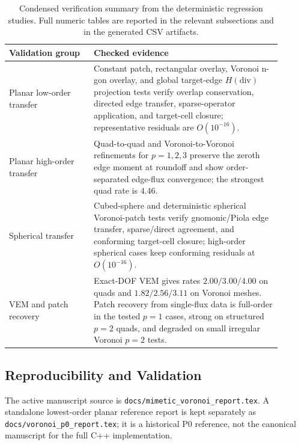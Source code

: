 \documentclass[11pt]{article}
\begin{document}
\begin{table}[t]
  \centering
  \small
  \begin{tabular}{@{}L{0.28\linewidth}L{0.62\linewidth}@{}}
  \toprule
  Validation group & Checked evidence \\
  \midrule
  Planar low-order transfer &
  Constant patch, rectangular overlay, Voronoi n-gon overlay, and global
  target-edge \(H(\mathrm{div})\) projection tests verify overlap conservation,
  directed edge transfer, sparse-operator application, and target-cell closure;
  representative residuals are \(O(10^{-16})\). \\
  Planar high-order transfer &
  Quad-to-quad and Voronoi-to-Voronoi refinements for \(p=1,2,3\) preserve the
  zeroth edge moment at roundoff and show order-separated edge-flux convergence;
  the strongest quad rate is \(4.46\). \\
  Spherical transfer &
  Cubed-sphere and deterministic spherical Voronoi-patch tests verify
  gnomonic/Piola edge transfer, sparse/direct agreement, and conforming
  target-cell closure; high-order spherical cases keep conforming residuals at
  \(O(10^{-16})\). \\
  VEM and patch recovery &
  Exact-DOF VEM gives rates \(2.00/3.00/4.00\) on quads and
  \(1.82/2.56/3.11\) on Voronoi meshes.  Patch recovery from single-flux data is
  full-order in the tested \(p=1\) cases, strong on structured \(p=2\) quads,
  and degraded on small irregular Voronoi \(p=2\) tests. \\
  \bottomrule
  \end{tabular}
  \caption{Condensed verification summary from the deterministic regression
  studies.  Full numeric tables are reported in the relevant subsections and in
  the generated CSV artifacts.}
  \label{tab:verification-summary}
\end{table}

\subsection{Reproducibility and Validation}
\label{sec:reproducibility}

The active manuscript source is \texttt{docs/mimetic\_voronoi\_report.tex}.  A
standalone lowest-order planar reference report is kept separately as
\texttt{docs/voronoi\_p0\_report.tex}; it is a historical P0 reference, not the
canonical manuscript for the full C++ implementation.
\end{document}
